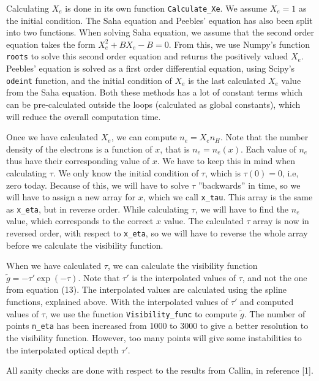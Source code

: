 \documentclass[12pt]{article}
\begin{document}
Calculating $X_e$ is done in its own function \verb|Calculate_Xe|. We assume $X_e = 1$ as the initial condition. The Saha equation and Peebles' equation has also been split into two functions. When solving Saha equation, we assume that the second order equation takes the form $X_e^2 + BX_e - B = 0$. From this, we use Numpy's function \verb|roots| to solve this second order equation and returns the positively valued $X_e$. Peebles' equation is solved as a first order differential equation, using Scipy's \verb|odeint| function, and the initial condition of $X_e$ is the last calculated $X_e$ value from the Saha equation. Both these methods has a lot of constant terms which can be pre-calculated outside the loops (calculated as global constants), which will reduce the overall computation time.

Once we have calculated $X_e$, we can compute $n_e = X_e n_H$. Note that the number density of the electrons is a function of $x$, that is $n_e = n_e(x)$. Each value of $n_e$ thus have their corresponding value of $x$. We have to keep this in mind when calculating $\tau$. We only know the initial condition of $\tau$, which is $\tau(0) = 0$, i.e, zero today. Because of this, we will have to solve $\tau$ ''backwards'' in time, so we will have to assign a new array for $x$, which we call \verb|x_tau|. This array is the same as \verb|x_eta|, but in reverse order. While calculating $\tau$, we will have to find the $n_e$ value, which corresponds to the correct $x$ value. The calculated $\tau$ array is now in reversed order, with respect to \verb|x_eta|, so we will have to reverse the whole array before we calculate the visibility function.

When we have calculated $\tau$, we can calculate the visibility function $\tilde{g} = -\tau'\exp(-\tau)$. Note that $\tau'$ is the interpolated values of $\tau$, and not the one from equation (13). The interpolated values are calculated using the spline functions, explained above. With the interpolated values of $\tau'$ and computed values of $\tau$, we use the function \verb|Visibility_func| to compute $\tilde{g}$. The number of points \verb|n_eta| has been increased from 1000 to 3000 to give a better resolution to the visibility function. However, too many points will give some instabilities to the interpolated optical depth $\tau'$.

All sanity checks are done with respect to the results from  Callin, in reference [1].
\end{document}
